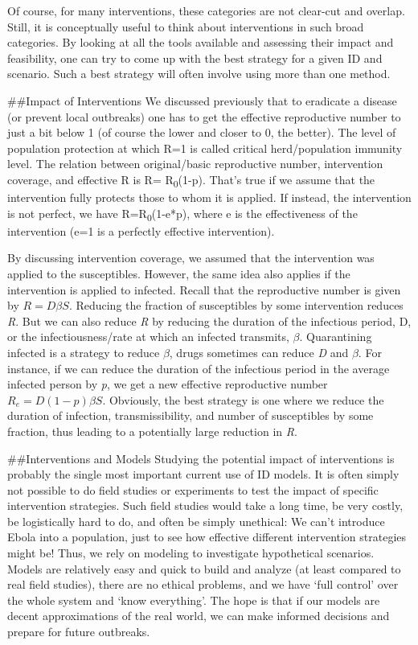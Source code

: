 \documentclass[]{book}
\theoremstyle{definition}
\theoremstyle{definition}
\theoremstyle{definition}
\theoremstyle{remark}
\begin{document}
Of course, for many interventions, these categories are not clear-cut
and overlap. Still, it is conceptually useful to think about
interventions in such broad categories. By looking at all the tools
available and assessing their impact and feasibility, one can try to
come up with the best strategy for a given ID and scenario. Such a best
strategy will often involve using more than one method.

\#\#Impact of Interventions We discussed previously that to eradicate a
disease (or prevent local outbreaks) one has to get the effective
reproductive number to just a bit below 1 (of course the lower and
closer to 0, the better). The level of population protection at which
R=1 is called critical herd/population immunity level. The relation
between original/basic reproductive number, intervention coverage, and
effective R is R= R\textsubscript{0}(1-p). That's true if we assume that
the intervention fully protects those to whom it is applied. If instead,
the intervention is not perfect, we have R=R\textsubscript{0}(1-e*p),
where e is the effectiveness of the intervention (e=1 is a perfectly
effective intervention).

By discussing intervention coverage, we assumed that the intervention
was applied to the susceptibles. However, the same idea also applies if
the intervention is applied to infected. Recall that the reproductive
number is given by \(R = D \beta S\). Reducing the fraction of
susceptibles by some intervention reduces \emph{R}. But we can also
reduce \emph{R} by reducing the duration of the infectious period, D, or
the infectiousness/rate at which an infected transmits, \(\beta\).
Quarantining infected is a strategy to reduce \(\beta\), drugs sometimes
can reduce \emph{D} and \(\beta\). For instance, if we can reduce the
duration of the infectious period in the average infected person by
\emph{p}, we get a new effective reproductive number
\(R_{e} = D(1-p) \beta S\). Obviously, the best strategy is one where we
reduce the duration of infection, transmissibility, and number of
susceptibles by some fraction, thus leading to a potentially large
reduction in \emph{R}.

\#\#Interventions and Models Studying the potential impact of
interventions is probably the single most important current use of ID
models. It is often simply not possible to do field studies or
experiments to test the impact of specific intervention strategies. Such
field studies would take a long time, be very costly, be logistically
hard to do, and often be simply unethical: We can't introduce Ebola into
a population, just to see how effective different intervention
strategies might be! Thus, we rely on modeling to investigate
hypothetical scenarios. Models are relatively easy and quick to build
and analyze (at least compared to real field studies), there are no
ethical problems, and we have `full control' over the whole system and
`know everything'. The hope is that if our models are decent
approximations of the real world, we can make informed decisions and
prepare for future outbreaks.
\end{document}
